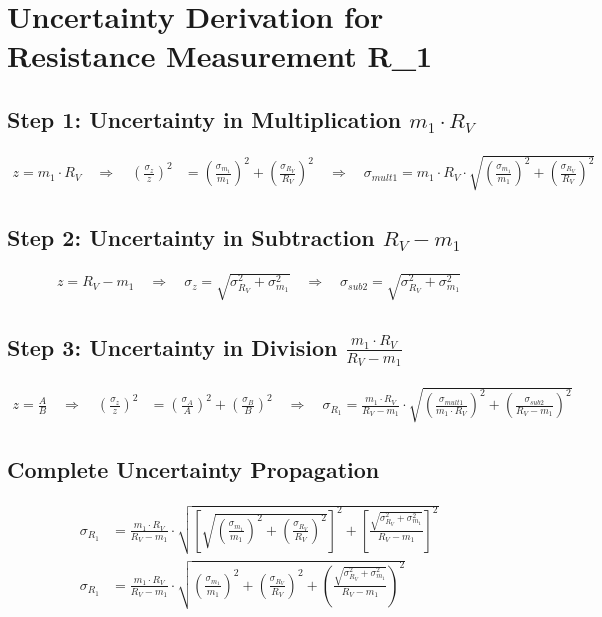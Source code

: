 \documentclass{article} %
\begin{document}
\newpage

\section{Uncertainty Derivation for Resistance Measurement R\_1}
\label{app:d_R1_uncertainty}

\subsection*{Step 1: Uncertainty in Multiplication $m_1 \cdot R_V$}
\begin{align*}
z = m_1 \cdot R_V \quad \Rightarrow \quad \left(\frac{\sigma_z}{z}\right)^2 &= \left(\frac{\sigma_{m_1}}{m_1}\right)^2 + \left(\frac{\sigma_{R_V}}{R_V}\right)^2 \quad \Rightarrow \quad \sigma_{mult1} = m_1 \cdot R_V \cdot \sqrt{\left(\frac{\sigma_{m_1}}{m_1}\right)^2 + \left(\frac{\sigma_{R_V}}{R_V}\right)^2}
\end{align*}

\subsection*{Step 2: Uncertainty in Subtraction $R_V - m_1$}
\begin{align*}
z = R_V - m_1 \quad \Rightarrow \quad \sigma_z = \sqrt{\sigma_{R_V}^2 + \sigma_{m_1}^2} \quad \Rightarrow \quad \sigma_{sub2} = \sqrt{\sigma_{R_V}^2 + \sigma_{m_1}^2}
\end{align*}

\subsection*{Step 3: Uncertainty in Division $\frac{m_1 \cdot R_V}{R_V - m_1}$}
\begin{align*}
z = \frac{A}{B} \quad \Rightarrow \quad \left(\frac{\sigma_z}{z}\right)^2 &= \left(\frac{\sigma_A}{A}\right)^2 + \left(\frac{\sigma_B}{B}\right)^2 \quad \Rightarrow \quad \sigma_{R_1} = \frac{m_1 \cdot R_V}{R_V - m_1} \cdot \sqrt{\left(\frac{\sigma_{mult1}}{m_1 \cdot R_V}\right)^2 + \left(\frac{\sigma_{sub2}}{R_V - m_1}\right)^2}
\end{align*}

\subsection*{Complete Uncertainty Propagation}
\begin{align*}
\sigma_{R_1} &= \frac{m_1 \cdot R_V}{R_V - m_1} \cdot \sqrt{\left[\sqrt{\left(\frac{\sigma_{m_1}}{m_1}\right)^2 + \left(\frac{\sigma_{R_V}}{R_V}\right)^2}\right]^2 + \left[\frac{\sqrt{\sigma_{R_V}^2 + \sigma_{m_1}^2}}{R_V - m_1}\right]^2} \\
\sigma_{R_1} &= \frac{m_1 \cdot R_V}{R_V - m_1} \cdot \sqrt{\left(\frac{\sigma_{m_1}}{m_1}\right)^2 + \left(\frac{\sigma_{R_V}}{R_V}\right)^2 + \left(\frac{\sqrt{\sigma_{R_V}^2 + \sigma_{m_1}^2}}{R_V - m_1}\right)^2}
\end{align*}
\end{document}
